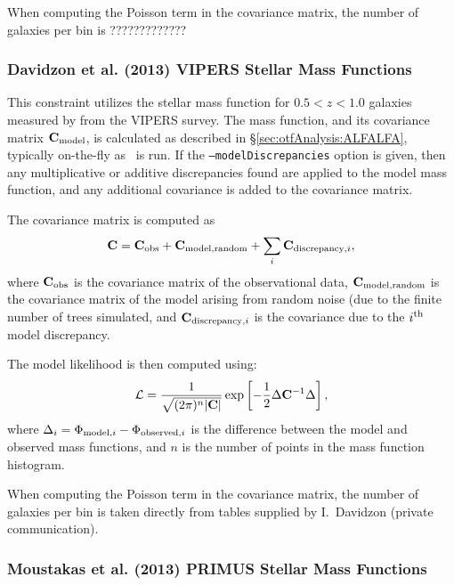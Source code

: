 When computing the Poisson term in the covariance matrix, the number of galaxies per bin is ?????????????

\subsubsection{Davidzon et al. (2013) VIPERS Stellar Mass Functions}\label{sec:AnalysisDavidzonVIPERSStellarMassFunction}

This constraint utilizes the stellar mass function for $0.5 < z< 1.0$ galaxies measured by \cite{davidzon_vimos_2013} from the VIPERS survey. The mass function, and its covariance matrix ${\bf C}_{\rm model}$, is calculated as described in \S\ref{sec:otfAnalysis:ALFALFA}, typically on-the-fly as \glc\ is run. If the {\tt --modelDiscrepancies} option is given, then any multiplicative or additive discrepancies found are applied to the model mass function, and any additional covariance is added to the covariance matrix.

The covariance matrix is computed as
\begin{equation}
 {\bf C} = {\bf C}_{\rm obs} + {\bf C}_{\rm model,random} + \sum_i {\bf C}_{{\rm discrepancy}, i},
\end{equation}
where ${\bf C}_{\rm obs}$ is the covariance matrix of the observational data, ${\bf C}_{\rm model,random}$ is the covariance matrix of the model arising from random noise (due to the finite number of trees simulated, and ${\bf C}_{{\rm discrepancy}, i}$ is the covariance due to the $i^{\rm th}$ model discrepancy.

The model likelihood is then computed using:
\begin{equation}
 \mathcal{L} = {1 \over \sqrt{(2 \pi)^n |{\bf C}|}} \exp\left[ -{1\over 2} \Delta {\bf C}^{-1} \Delta \right],
\end{equation}
where $\Delta_i = \Phi_{{\rm model}, i} - \Phi_{{\rm observed}, i}$ is the difference between the model and observed mass functions, and $n$ is the number of points in the mass function histogram.

When computing the Poisson term in the covariance matrix, the number of galaxies per bin is taken directly from tables supplied by I.~Davidzon (private communication).

\subsubsection{Moustakas et al. (2013) PRIMUS Stellar Mass Functions}\label{sec:AnalysisMoustakasPRIMUSSStellarMassFunctions}

